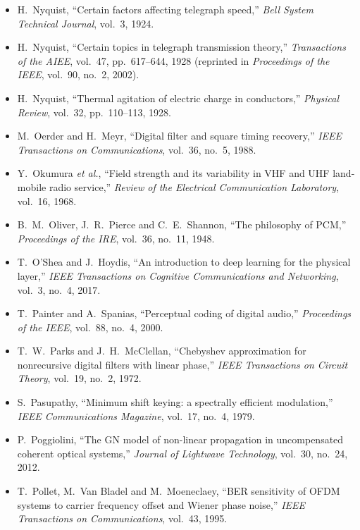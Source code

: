 \begin{itemize}[leftmargin=1.5em,itemindent=-1.5em,itemsep=1.5pt plus 1pt,parsep=0pt,topsep=4pt,label={}]
\item H.~Nyquist, ``Certain factors affecting telegraph speed,'' \emph{Bell System Technical Journal}, vol.~3, 1924.
\item H.~Nyquist, ``Certain topics in telegraph transmission theory,'' \emph{Transactions of the AIEE}, vol.~47, pp.~617--644, 1928 (reprinted in \emph{Proceedings of the IEEE}, vol.~90, no.~2, 2002).
\item H.~Nyquist, ``Thermal agitation of electric charge in conductors,'' \emph{Physical Review}, vol.~32, pp.~110--113, 1928.
\item M.~Oerder and H.~Meyr, ``Digital filter and square timing recovery,'' \emph{IEEE Transactions on Communications}, vol.~36, no.~5, 1988.
\item Y.~Okumura \emph{et al.}, ``Field strength and its variability in VHF and UHF land-mobile radio service,'' \emph{Review of the Electrical Communication Laboratory}, vol.~16, 1968.
\item B.~M.~Oliver, J.~R.~Pierce and C.~E.~Shannon, ``The philosophy of PCM,'' \emph{Proceedings of the IRE}, vol.~36, no.~11, 1948.
\item T.~O'Shea and J.~Hoydis, ``An introduction to deep learning for the physical layer,'' \emph{IEEE Transactions on Cognitive Communications and Networking}, vol.~3, no.~4, 2017.
\item T.~Painter and A.~Spanias, ``Perceptual coding of digital audio,'' \emph{Proceedings of the IEEE}, vol.~88, no.~4, 2000.
\item T.~W.~Parks and J.~H.~McClellan, ``Chebyshev approximation for nonrecursive digital filters with linear phase,'' \emph{IEEE Transactions on Circuit Theory}, vol.~19, no.~2, 1972.
\item S.~Pasupathy, ``Minimum shift keying: a spectrally efficient modulation,'' \emph{IEEE Communications Magazine}, vol.~17, no.~4, 1979.
\item P.~Poggiolini, ``The GN model of non-linear propagation in uncompensated coherent optical systems,'' \emph{Journal of Lightwave Technology}, vol.~30, no.~24, 2012.
\item T.~Pollet, M.~Van Bladel and M.~Moeneclaey, ``BER sensitivity of OFDM systems to carrier frequency offset and Wiener phase noise,'' \emph{IEEE Transactions on Communications}, vol.~43, 1995.

\end{itemize}

